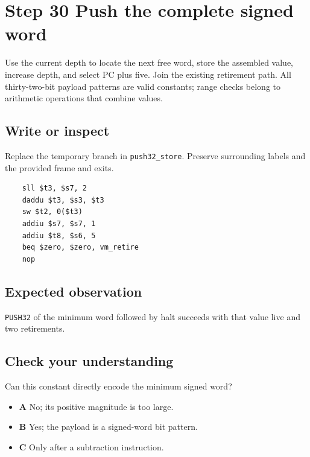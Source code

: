\section{Step 30 Push the complete signed word}\label{vm-s30}

Use the current depth to locate the next free word, store the assembled value, increase depth, and select PC plus five. Join the existing retirement path. All thirty-two-bit payload patterns are valid constants; range checks belong to arithmetic operations that combine values.

\subsection{Write or inspect}
Replace the temporary branch in \texttt{push32\_store}. Preserve surrounding labels and the provided frame and exits.

\begin{verbatim}
    sll $t3, $s7, 2
    daddu $t3, $s3, $t3
    sw $t2, 0($t3)
    addiu $s7, $s7, 1
    addiu $t8, $s6, 5
    beq $zero, $zero, vm_retire
    nop
\end{verbatim}
\subsection{Expected observation}
\texttt{PUSH32} of the minimum word followed by halt succeeds with that value live and two retirements.

\subsection{Check your understanding}
Can this constant directly encode the minimum signed word?

\begin{itemize}
  \item \textbf{A} No; its positive magnitude is too large.
  \item \textbf{B} Yes; the payload is a signed-word bit pattern.
  \item \textbf{C} Only after a subtraction instruction.
\end{itemize}
